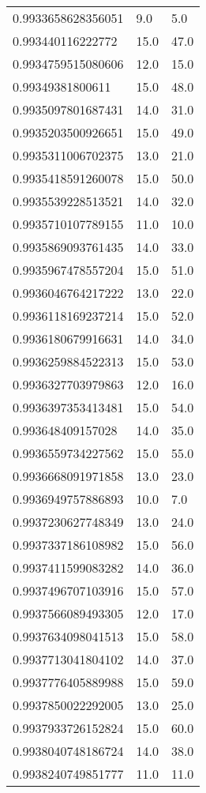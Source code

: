 \begin{center}
\begin{supertabular}[H]{p{0.30\textwidth}p{0.05\textwidth}p{0.05\textwidth}}
0.9933658628356051 & 9.0 & 5.0 \\ 
0.993440116222772 & 15.0 & 47.0 \\ 
0.9934759515080606 & 12.0 & 15.0 \\ 
0.99349381800611 & 15.0 & 48.0 \\ 
0.9935097801687431 & 14.0 & 31.0 \\ 
0.9935203500926651 & 15.0 & 49.0 \\ 
0.9935311006702375 & 13.0 & 21.0 \\ 
0.9935418591260078 & 15.0 & 50.0 \\ 
0.9935539228513521 & 14.0 & 32.0 \\ 
0.9935710107789155 & 11.0 & 10.0 \\ 
0.9935869093761435 & 14.0 & 33.0 \\ 
0.9935967478557204 & 15.0 & 51.0 \\ 
0.9936046764217222 & 13.0 & 22.0 \\ 
0.9936118169237214 & 15.0 & 52.0 \\ 
0.9936180679916631 & 14.0 & 34.0 \\ 
0.9936259884522313 & 15.0 & 53.0 \\ 
0.9936327703979863 & 12.0 & 16.0 \\ 
0.9936397353413481 & 15.0 & 54.0 \\ 
0.993648409157028 & 14.0 & 35.0 \\ 
0.9936559734227562 & 15.0 & 55.0 \\ 
0.9936668091971858 & 13.0 & 23.0 \\ 
0.9936949757886893 & 10.0 & 7.0 \\ 
0.9937230627748349 & 13.0 & 24.0 \\ 
0.9937337186108982 & 15.0 & 56.0 \\ 
0.9937411599083282 & 14.0 & 36.0 \\ 
0.9937496707103916 & 15.0 & 57.0 \\ 
0.9937566089493305 & 12.0 & 17.0 \\ 
0.9937634098041513 & 15.0 & 58.0 \\ 
0.9937713041804102 & 14.0 & 37.0 \\ 
0.9937776405889988 & 15.0 & 59.0 \\ 
0.9937850022292005 & 13.0 & 25.0 \\ 
0.9937933726152824 & 15.0 & 60.0 \\ 
0.9938040748186724 & 14.0 & 38.0 \\ 
0.9938240749851777 & 11.0 & 11.0 \\ 

\end{supertabular}
\end{center}
